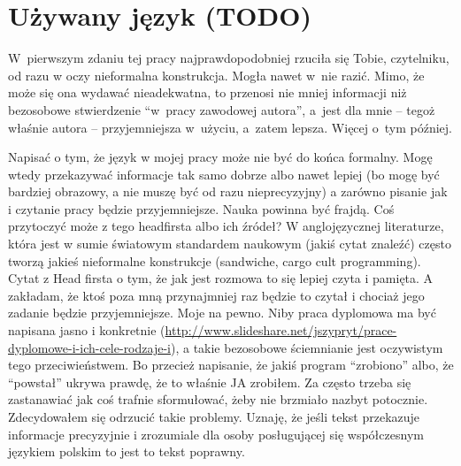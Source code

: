 
\section{Używany język (TODO)}
W~pierwszym zdaniu tej pracy najprawdopodobniej rzuciła się Tobie, czytelniku, od razu w oczy nieformalna konstrukcja. Mogła nawet w~nie razić. Mimo, że może się ona wydawać nieadekwatna, to przenosi nie mniej informacji niż bezosobowe stwierdzenie ``w~pracy zawodowej autora'', a~jest dla mnie -- tegoż właśnie autora -- przyjemniejsza w~użyciu, a~zatem lepsza. Więcej o~tym później.

Napisać o tym, że język w mojej pracy może nie być do końca formalny. Mogę wtedy przekazywać informacje tak samo dobrze albo nawet lepiej (bo mogę być bardziej obrazowy, a nie muszę być od razu nieprecyzyjny) a zarówno pisanie jak i czytanie pracy będzie przyjemniejsze. Nauka powinna być frajdą. Coś przytoczyć może z tego headfirsta albo ich źródeł? W anglojęzycznej literaturze, która jest w sumie światowym standardem naukowym (jakiś cytat znaleźć) często tworzą jakieś nieformalne konstrukcje (sandwiche, cargo cult programming). Cytat z Head firsta o tym, że jak jest rozmowa to się lepiej czyta i pamięta. A zakładam, że ktoś poza mną przynajmniej raz będzie to czytał i chociaż jego zadanie będzie przyjemniejsze. Moje na pewno. Niby praca dyplomowa ma być napisana jasno i konkretnie (\url{http://www.slideshare.net/jszypryt/prace-dyplomowe-i-ich-cele-rodzaje-i}), a takie bezosobowe ściemnianie jest oczywistym tego przeciwieństwem. Bo przecież napisanie, że jakiś program ``zrobiono'' albo, że ``powstał'' ukrywa prawdę, że to właśnie JA zrobiłem. Za często trzeba się zastanawiać jak coś trafnie sformułować, żeby nie brzmiało nazbyt potocznie. Zdecydowałem się odrzucić takie problemy. Uznaję, że jeśli tekst przekazuje informacje precyzyjnie i zrozumiale dla osoby posługującej się współczesnym językiem polskim to jest to tekst poprawny.

